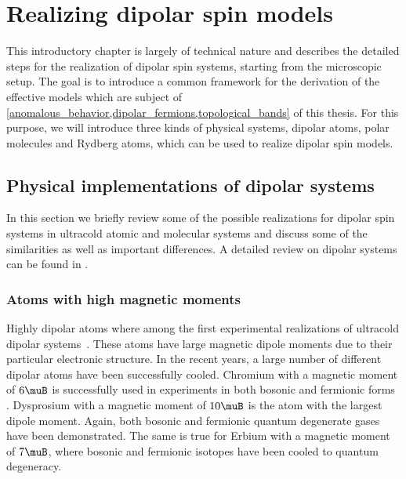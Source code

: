 \chapter{Realizing dipolar spin models}
\label{dipolar_spinmodels}

This introductory chapter is largely of technical nature and describes the detailed steps for
the realization of dipolar spin systems, starting from the microscopic setup. The goal is to
introduce a common framework for the derivation of the effective models which are subject of
\cref{anomalous_behavior,dipolar_fermions,topological_bands} of this thesis. For this purpose,
we will introduce three kinds of physical systems, dipolar atoms, polar molecules and Rydberg
atoms, which can be used to realize dipolar spin models.




\section{Physical implementations of dipolar systems}

In this section we briefly review some of the possible realizations for dipolar spin systems in
ultracold atomic and molecular systems and discuss some of the similarities as well as important
differences. A detailed review on dipolar systems can be found in .


\subsection{Atoms with high magnetic moments}

Highly dipolar atoms where among the first experimental realizations of ultracold dipolar
systems~\cite{Griesmaier2005a}. These atoms have large magnetic dipole moments due to their
particular electronic structure. In the recent years, a large number of different dipolar atoms
have been successfully cooled. Chromium with a magnetic moment of $6\muB$ is successfully
used in experiments in both bosonic \cite{Griesmaier2005a,Beaufils2008} and fermionic forms
\cite{Naylor2015}. Dysprosium with a magnetic moment of $10\muB$ is the atom with the largest
dipole moment. Again, both bosonic \cite{Lu2011} and fermionic \cite{Lu2012} quantum degenerate
gases have been demonstrated. The same is true for Erbium with a magnetic moment of $7\muB$, where
bosonic \cite{Aikawa2012} and fermionic isotopes \cite{Aikawa2014} have been cooled to quantum
degeneracy.

